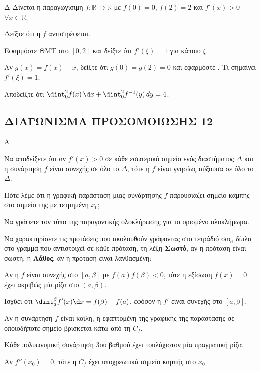 \begin{thema}{Δ}
Δίνεται η παραγωγίσιμη $f:\mathbb{R}\to\mathbb{R}$ με $f(0)=0$, $f(2)=2$ και $f'(x) > 0$ $\forall x\in\mathbb{R}$.
\begin{erwthma}
    \item Δείξτε ότι η $f$ αντιστρέφεται. 
    \item Εφαρμόστε ΘΜΤ στο $[0,2]$ και δείξτε ότι $f'(\xi) = 1$ για κάποιο $\xi$. 
    \item Αν $g(x) = f(x) - x$, δείξτε ότι $g(0)=g(2)=0$ και εφαρμόστε . Τι σημαίνει $f'(\xi)=1$; 
    \item Αποδείξτε ότι $\dint_0^2 f(x)\,\d x + \dint_0^2 f^{-1}(y)\,dy = 4$. 
\end{erwthma}
\end{thema}

\newpage
\subsection{ΔΙΑΓΩΝΙΣΜΑ ΠΡΟΣΟΜΟΙΩΣΗΣ 12}
\begin{thema}{Α}
\begin{erwthma}
    \item Να αποδείξετε ότι αν $f'(x)>0$ σε κάθε εσωτερικό σημείο ενός διαστήματος $\Delta$ και η συνάρτηση $f$ είναι συνεχής σε όλο το $\Delta$, τότε η $f$ είναι γνησίως αύξουσα σε όλο το $\Delta$. 
    \item Πότε λέμε ότι η γραφική παράσταση μιας συνάρτησης $f$ παρουσιάζει σημείο καμπής στο σημείο της με τετμημένη $x_0$; 
    \item Να γράψετε τον τύπο της παραγοντικής ολοκλήρωσης για το ορισμένο ολοκλήρωμα. 
    \item Να χαρακτηρίσετε τις προτάσεις που ακολουθούν γράφοντας στο τετράδιό σας, δίπλα στο γράμμα που αντιστοιχεί σε κάθε πρόταση, τη λέξη \textbf{Σωστό},
αν η πρόταση είναι σωστή, ή \textbf{Λάθος}, αν η πρόταση είναι λανθασμένη:
    \begin{alist}
        \item Αν η $f$ είναι συνεχής στο $[a,\beta]$ με $f(a)f(\beta)<0$, τότε η εξίσωση $f(x)=0$ έχει ακριβώς μία ρίζα στο $(a,\beta)$.
        \item Ισχύει ότι $\dint_a^\beta f'(x)\d x = f(\beta)-f(a)$, εφόσον η $f'$ είναι συνεχής στο $[a,\beta]$.
        \item Αν η συνάρτηση $f$ είναι κοίλη, η εφαπτομένη της γραφικής της παράστασης σε οποιοδήποτε σημείο βρίσκεται κάτω από τη $C_f$.
        \item Κάθε πολυωνυμική συνάρτηση 3ου βαθμού έχει τουλάχιστον μία πραγματική ρίζα.
        \item Αν $f''(x_0)=0$, τότε η $C_f$ έχει υποχρεωτικά σημείο καμπής στο $x_0$.
    \end{alist} 
\end{erwthma}
\end{thema}

